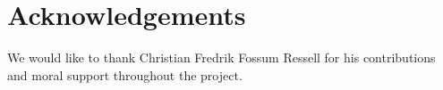 \section*{Acknowledgements}
We would like to thank Christian Fredrik Fossum Ressell for his
contributions and moral support throughout the project.
